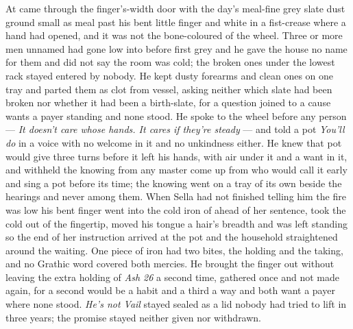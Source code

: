 At   came through the finger's-width door with the day's meal-fine grey slate dust ground small as meal past his bent little finger and white in a fist-crease where a hand had opened, and it was not the bone-coloured  of the wheel. Three or more men unnamed had gone low into  before first grey and he gave the house no name for them and did not say the room was cold; the broken ones under the lowest rack stayed entered by nobody. He kept dusty forearms and clean ones on one tray and parted them as clot from vessel, asking neither which slate had been broken nor whether it had been a birth-slate, for a question joined to a cause wants a payer standing and none stood. He spoke to the wheel before any person --- \emph{It doesn't care whose hands. It cares if they're steady} --- and told a pot \emph{You'll do} in a voice with no welcome in it and no unkindness either. He knew  that pot would give three turns before it left his hands, with air under it and a want in it, and withheld the knowing from any master come up from  who would call it early and sing a pot before its time; the knowing went on a tray of its own beside the hearings and never among them. When Sella had not finished telling him the fire was low his bent finger went into the cold iron of  ahead of her sentence, took the cold out of the fingertip, moved his tongue a hair's breadth and was left standing so the end of her instruction arrived at the pot and the household straightened around the waiting. One piece of iron had two bites, the holding and the taking, and no Grathic word covered both mercies. He brought the finger out without leaving the extra holding of \emph{Ash 26} a second time, gathered once and not made again, for a second would be a habit and a third a way and both want a payer where none stood. \emph{He's not Vail} stayed sealed as a lid nobody had tried to lift in three years; the promise stayed neither given nor withdrawn.

